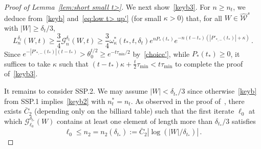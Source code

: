 \documentclass[10pt]{amsart}
\theoremstyle{definition}\newtheorem{defi}[theo]{Definition}\newtheorem{rema}[theo]{Remark}\newtheorem{exam}[theo]{Example}\newtheorem{exem}[theo]{Example}\newtheorem{nota}[theo]{Notation}
\newcommand{\cG}{\mathcal{G}}
\newcommand{\cW}{\mathcal{W}}
\newcommand{\hW}{\widehat{\cW}}
\begin{document}
\begin{proof}[Proof of Lemma~\ref{lem:short small t>}]
We next show~\eqref{keyb3}. For $n\ge n_t$, we deduce from~\eqref{keyb} and~\eqref{eq:low t> up'} (for small $\kappa>0$) that, for all $W\in \hW^s$ with $|W|\ge \delta_t /3$,
\begin{equation}\label{choicekappa}
L_n^{\delta_t}(W,t) \ge \frac {3}{4} \cG_n^{\delta_t}(W,t)\ge \frac {3}{4}\omega_\kappa^*(t_*,t,\delta_t) e^{nP_*(t_*)} e^{-n (t-t_*)\left(\left|P'_{*,-}(t_*)\right|+\kappa\right)}\,.
\end{equation}
Since $ e^{-| P'_{*,-}(t_*)| (t-t_*)} > \theta_0^{t/2}\ge e^{-t\tau_{\min}/2}$ by~\eqref{choice'}, while $P_*(t_*)\ge 0$, it suffices to take $\kappa$ such that $ (t-t_*)\kappa +\frac{t}{2}\tau_{\min} < t \tau_{\min} $ to complete the proof of~\eqref{keyb3}.


It remains to consider SSP.2. We may assume $|W|<\delta_{t_*}/3$ since otherwise~\eqref{keyb} from SSP.1 implies~\eqref{keyb2} with $n_{t}^*=n_t$. As observed in the proof of~\cite[Cor.~5.3]{BD1}, there exists $\bar C_2$ (depending only on the billiard table) such that the first iterate $\ell_0$ at which $\cG^{\delta_{t_*}}_{\ell_0}(W)$ contains at least one element of length more than $\delta_{t_*}/3$ satisfies
\[
\ell_0 \le n_2=n_2(\delta_{t_*}) := \bar C_2 \left|\log\left(|W|/\delta_{t_*}\right)\right|\,.
\]


\end{proof}
\end{document}
